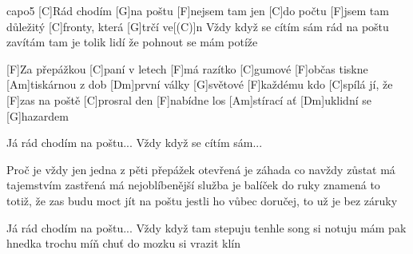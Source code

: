 \hfill capo5
[C]Rád chodím [G]na poštu
[F]nejsem tam jen [C]do počtu
[F]jsem tam důležitý [C]fronty, která [G]trčí ve[(C)]n
Vždy když se cítím sám
rád na poštu zavítám
tam je tolik lidí že
pohnout se mám potíže

[F]Za přepážkou [C]paní v letech [F]má razítko [C]gumové
[F]občas tiskne [Am]tiskárnou z dob [Dm]první války [G]světové
[F]každému kdo [C]spílá jí, že [F]zas na poště [C]prosral den
[F]nabídne los [Am]stírací ať [Dm]uklidní se [G]hazardem

Já rád chodím na poštu...
Vždy když se cítím sám...

Proč je vždy jen jedna z pěti přepážek otevřená
je záhada co navždy zůstat má tajemstvím zastřená
má nejoblíbenější služba je balíček do ruky
znamená to totiž, že zas budu moct jít na poštu
jestli ho vůbec doručej, to už je bez záruky

Já rád chodím na poštu...
Vždy když tam stepuju
tenhle song si notuju
mám pak hnedka trochu míň
chuť do mozku si vrazit klín
\columnbreak
